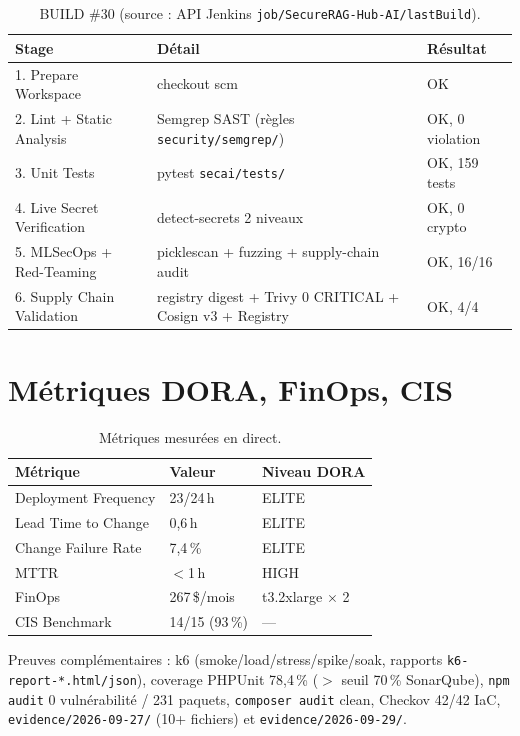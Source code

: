 \documentclass[12pt,a4paper,openany]{report}
\begin{document}
\begin{table}[h]
\centering
\small
\begin{tabular}{@{}lll@{}}
\toprule
\textbf{Stage} & \textbf{Détail} & \textbf{Résultat} \\
\midrule
1. Prepare Workspace & checkout scm & OK \\
2. Lint + Static Analysis & Semgrep SAST (règles \texttt{security/semgrep/}) & OK, 0 violation \\
3. Unit Tests & pytest \texttt{secai/tests/} & OK, 159 tests \\
4. Live Secret Verification & detect-secrets 2 niveaux & OK, 0 crypto \\
5. MLSecOps + Red-Teaming & picklescan + fuzzing + supply-chain audit & OK, 16/16 \\
6. Supply Chain Validation & registry digest + Trivy 0 CRITICAL + Cosign v3 + Registry & OK, 4/4 \\
\bottomrule
\end{tabular}
\caption{BUILD \#30 (source : API Jenkins \texttt{job/SecureRAG-Hub-AI/lastBuild}).}
\label{tab:build30}
\end{table}

\section{Métriques DORA, FinOps, CIS}

\begin{table}[h]
\centering
\small
\begin{tabular}{@{}lll@{}}
\toprule
\textbf{Métrique} & \textbf{Valeur} & \textbf{Niveau DORA} \\
\midrule
Deployment Frequency & 23/24\,h & ELITE \\
Lead Time to Change & 0,6\,h & ELITE \\
Change Failure Rate & 7,4\,\% & ELITE \\
MTTR & $<$1\,h & HIGH \\
FinOps & 267\,\$/mois & t3.2xlarge $\times$ 2 \\
CIS Benchmark & 14/15 (93\,\%) & --- \\
\bottomrule
\end{tabular}
\caption{Métriques mesurées en direct.}
\label{tab:dora}
\end{table}

Preuves complémentaires : k6 (smoke/load/stress/spike/soak, rapports
\texttt{k6-report-*.html/json}), coverage PHPUnit 78,4\,\% ($>$ seuil 70\,\% SonarQube),
\texttt{npm audit} 0 vulnérabilité / 231 paquets, \texttt{composer audit} clean,
Checkov 42/42 IaC, \texttt{evidence/2026-09-27/} (10+ fichiers) et \texttt{evidence/2026-09-29/}.
\end{document}
